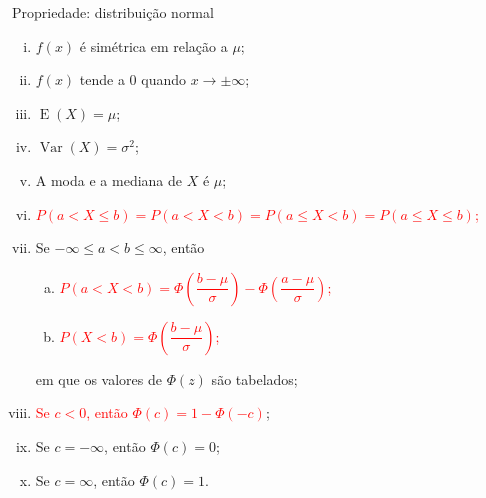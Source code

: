 \documentclass[9pt]{beamer}
\DeclareMathOperator{\espe}{E}
\DeclareMathOperator{\vari}{Var}
\begin{document}
\begin{frame}{Propriedade: distribuição normal}
 \begin{enumerate}[i)]
 \item $f(x)$ é simétrica em relação a $\mu$;
 \vfill
 
 \item $f(x)$ tende a $0$ quando $x \rightarrow \pm \infty$;
 \vfill
 
 \item $\espe(X)= \mu$;
 \vfill
 
 \item $\vari(X) =\sigma^2$;
 \vfill
 
 \item A moda e a mediana de $X$ é $\mu$;
 \vfill
 
 \item \textcolor{red}{ $P(a < X \leq b) = P(a < X < b) = P(a \leq X < b) = P(a \leq X \leq b)$;}
 \vfill
 
 \item Se $-\infty \leq a < b \leq \infty$, então
 \begin{enumerate}[a)]
  \item \textcolor{red}{$P(a < X < b) = \Phi\left( \dfrac{b-\mu}{\sigma} \right) - \Phi\left( \dfrac{a-\mu}{\sigma} \right)$;}
  \item \textcolor{red}{$P(X < b) = \Phi\left( \dfrac{b-\mu}{\sigma} \right)$;}
 \end{enumerate}
 em que os valores de $\Phi(z)$ são tabelados;
 \vfill
 
 \item \textcolor{red}{ Se $c < 0$, então $\Phi(c) = 1 - \Phi(-c)$};
 \vfill
 
 \item Se $c= -\infty$, então $\Phi(c) = 0$;
 \vfill
 
 \item Se $c = \infty$, então $\Phi(c) = 1$.
\end{enumerate}
\end{frame}
\end{document}
